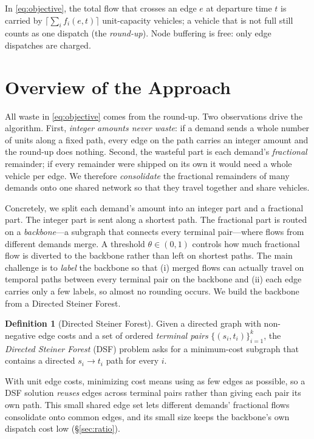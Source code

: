 \documentclass[11pt]{article}
\theoremstyle{definition}
\newtheorem{definition}{Definition}
\theoremstyle{remark}
\begin{document}
\noindent In \eqref{eq:objective}, the total flow that crosses an edge $e$ at departure time $t$ is
carried by $\bigl\lceil\sum_i f_i(e,t)\bigr\rceil$ unit-capacity vehicles; a vehicle that is not full
still counts as one dispatch (the \emph{round-up}). Node buffering is free: only edge dispatches are
charged.

\section{Overview of the Approach}\label{sec:overview}

All waste in \eqref{eq:objective} comes from the round-up. Two observations drive the algorithm. First, \emph{integer amounts never waste}: if a demand
sends a whole number of units along a fixed path, every edge on the path carries an integer amount and
the round-up does nothing. Second, the wasteful part is each demand's \emph{fractional} remainder; if
every remainder were shipped on its own it would need a whole vehicle per edge. We therefore
\emph{consolidate} the fractional remainders of many demands onto one shared network so that they
travel together and share vehicles.

Concretely, we split each demand's amount into an integer part and a fractional part. The integer part
is sent along a shortest path. The fractional part is routed on a \emph{backbone}---a subgraph that
connects every terminal pair---where flows from different demands merge. A threshold $\theta\in(0,1)$
controls how much fractional flow is diverted to the backbone rather than left on shortest paths. The
main challenge is to \emph{label} the backbone so that (i) merged flows can actually travel on temporal paths between every terminal pair on the backbone and (ii) each edge carries only a few labels, so almost no
rounding occurs. We build the backbone from a Directed Steiner Forest.

\begin{definition}[Directed Steiner Forest]\label{def:dsf}
Given a directed graph with non-negative edge costs and a set of ordered \emph{terminal pairs}
$\{(s_i,t_i)\}_{i=1}^{k}$, the \emph{Directed Steiner Forest} (DSF) problem asks for a minimum-cost
subgraph that contains a directed $s_i\!\to\!t_i$ path for every $i$.
\end{definition}

\noindent With unit edge costs, minimizing cost means using as few edges as possible, so a DSF
solution \emph{reuses} edges across terminal pairs rather than giving each pair its own path. This
small shared edge set lets different demands' fractional flows consolidate onto common edges, and its
small size keeps the backbone's own dispatch cost low (\S\ref{sec:ratio}).
\end{document}
